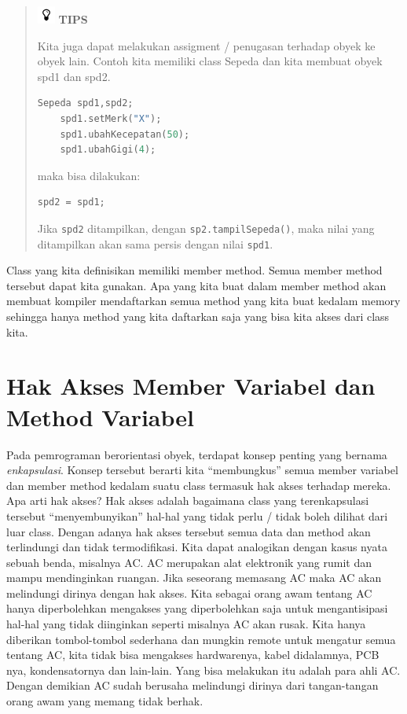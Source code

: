 \begin{quotation}
\includegraphics{../manuscript/images/tips}	\textbf{TIPS}
	
	Kita juga
	dapat melakukan assigment / penugasan terhadap obyek ke obyek lain.
	Contoh kita memiliki class Sepeda dan kita membuat obyek spd1 dan spd2.
	
	\begin{lstlisting}[language=c++, numbers=none]
	Sepeda spd1,spd2;
	spd1.setMerk("X");
	spd1.ubahKecepatan(50);
	spd1.ubahGigi(4);
	\end{lstlisting}
	
	maka bisa dilakukan:
	
	\begin{lstlisting}[language=c++, numbers=none]
	spd2 = spd1;
	\end{lstlisting}
	
	Jika \texttt{spd2} ditampilkan, dengan \texttt{sp2.tampilSepeda()}, maka
	nilai yang ditampilkan akan sama persis dengan nilai \texttt{spd1}.
\end{quotation}


Class yang kita definisikan memiliki member method. Semua member method
tersebut dapat kita gunakan. Apa yang kita buat dalam member method akan
membuat kompiler mendaftarkan semua method yang kita buat kedalam memory
sehingga hanya method yang kita daftarkan saja yang bisa kita akses dari
class kita.

\section{Hak Akses Member Variabel dan Method
Variabel}\label{hak-akses-member-variabel-dan-method-variabel}

Pada pemrograman berorientasi obyek, terdapat konsep penting yang
bernama \emph{enkapsulasi}. Konsep tersebut berarti kita ``membungkus''
semua member variabel dan member method kedalam suatu class termasuk hak
akses terhadap mereka. Apa arti hak akses? Hak akses adalah bagaimana
class yang terenkapsulasi tersebut ``menyembunyikan'' hal-hal yang tidak
perlu / tidak boleh dilihat dari luar class. Dengan adanya hak akses
tersebut semua data dan method akan terlindungi dan tidak termodifikasi.
Kita dapat analogikan dengan kasus nyata sebuah benda, misalnya AC. AC
merupakan alat elektronik yang rumit dan mampu mendinginkan ruangan.
Jika seseorang memasang AC maka AC akan melindungi dirinya dengan hak
akses. Kita sebagai orang awam tentang AC hanya diperbolehkan mengakses
yang diperbolehkan saja untuk mengantisipasi hal-hal yang tidak
diinginkan seperti misalnya AC akan rusak. Kita hanya diberikan
tombol-tombol sederhana dan mungkin remote untuk mengatur semua tentang
AC, kita tidak bisa mengakses hardwarenya, kabel didalamnya, PCB nya,
kondensatornya dan lain-lain. Yang bisa melakukan itu adalah para ahli
AC. Dengan demikian AC sudah berusaha melindungi dirinya dari
tangan-tangan orang awam yang memang tidak berhak.

